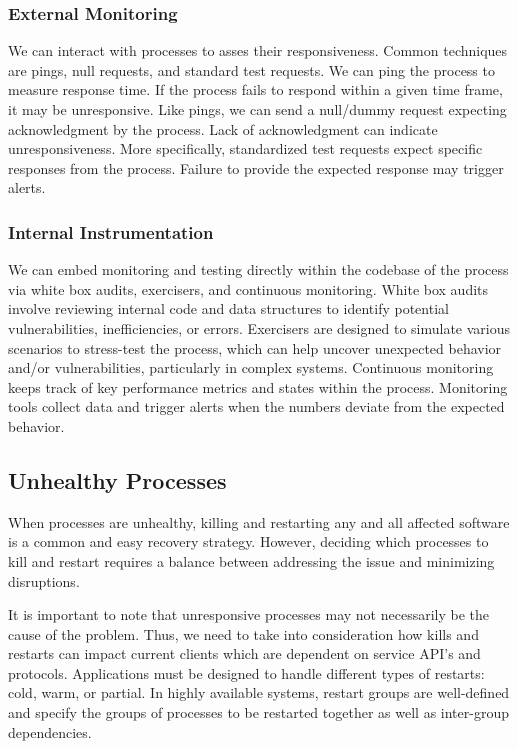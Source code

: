 \documentclass{report}
\begin{document}
\subsubsection{External Monitoring}
We can interact with processes to asses their responsiveness. Common techniques are pings, null
requests, and standard test requests. We can ping the process to measure response time. If the
process fails to respond within a given time frame, it may be unresponsive. Like pings, we can send
a null/dummy request expecting acknowledgment by the process. Lack of acknowledgment can indicate
unresponsiveness. More specifically, standardized test requests expect specific responses from the
process. Failure to provide the expected response may trigger alerts.


\subsubsection{Internal Instrumentation}
We can embed monitoring and testing directly within the codebase of the process via white box
audits, exercisers, and continuous monitoring. White box audits involve reviewing internal code and
data structures to identify potential vulnerabilities, inefficiencies, or errors. Exercisers are
designed to simulate various scenarios to stress-test the process, which can help uncover unexpected
behavior and/or vulnerabilities, particularly in complex systems. Continuous monitoring keeps track
of key performance metrics and states within the process. Monitoring tools collect data and trigger
alerts when the numbers deviate from the expected behavior.


\subsection{Unhealthy Processes}
When processes are unhealthy, killing and restarting any and all affected software is a common and
easy recovery strategy. However, deciding which processes to kill and restart requires a balance
between addressing the issue and minimizing disruptions.

It is important to note that unresponsive processes may not necessarily be the cause of the
problem. Thus, we need to take into consideration how kills and restarts can impact current clients
which are dependent on service API's and protocols. Applications must be designed to handle
different types of restarts: cold, warm, or partial. In highly available systems, restart groups are
well-defined and specify the groups of processes to be restarted together as well as inter-group
dependencies.
\end{document}
